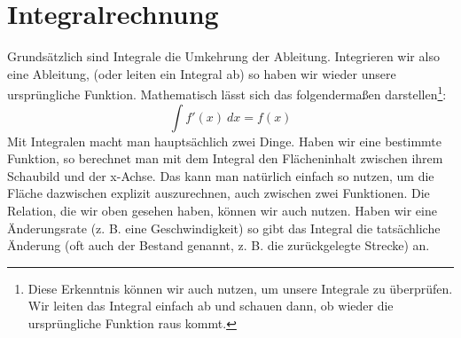 \section{Integralrechnung}
	Grundsätzlich sind Integrale die Umkehrung der Ableitung. Integrieren wir also
	eine Ableitung, (oder leiten ein Integral ab) so haben wir wieder unsere
	ursprüngliche Funktion. Mathematisch lässt sich das folgendermaßen
	darstellen\footnote{Diese Erkenntnis können wir auch nutzen, um unsere
	Integrale zu überprüfen. Wir leiten das Integral einfach ab und schauen dann,
	ob wieder die ursprüngliche Funktion raus kommt.}:
	\[\int f'(x)\ dx=f(x)\]
	Mit Integralen macht man hauptsächlich zwei Dinge. Haben wir eine bestimmte
	Funktion, so berechnet man mit dem Integral den Flächeninhalt zwischen ihrem
	Schaubild und der x-Achse. Das kann man natürlich einfach so nutzen, um die
	Fläche dazwischen explizit auszurechnen, auch zwischen zwei Funktionen. Die
	Relation, die wir oben gesehen haben, können wir auch nutzen. Haben wir eine
	Änderungsrate (z. B. eine Geschwindigkeit) so gibt das Integral die
	tatsächliche Änderung (oft auch der Bestand genannt, z. B. die zurückgelegte
	Strecke) an.

	

	

	

	

	

